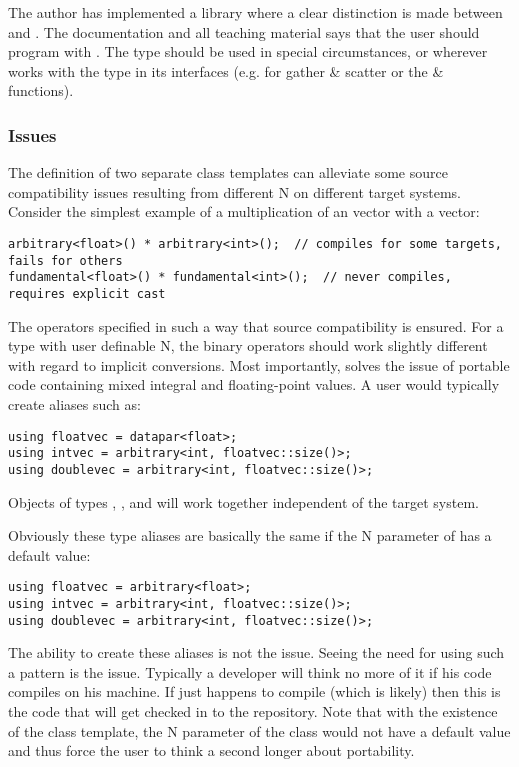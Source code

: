 The author has implemented a library where a clear distinction is made between  and .
The documentation and all teaching material says that the user should program with .
The  type should be used in special circumstances, or wherever  works with the  type in its interfaces (e.g. for gather \& scatter or the  \&  functions).

\subsubsection{Issues}
The definition of two separate class templates can alleviate some source compatibility issues resulting from different \code N on different target systems.
Consider the simplest example of a multiplication of an \intt vector with a \float vector:
\smallskip\begin{lstlisting}[style=Vc]
arbitrary<float>() * arbitrary<int>();  // compiles for some targets, fails for others
fundamental<float>() * fundamental<int>();  // never compiles, requires explicit cast
\end{lstlisting}
The \datapar[<T>] operators specified in such a way that source compatibility is ensured.
For a type with user definable \code N, the binary operators should work slightly different with regard to implicit conversions.
Most importantly,  solves the issue of portable code containing mixed integral and floating-point values.
A user would typically create aliases such as:
\smallskip\begin{lstlisting}[style=Vc]
using floatvec = datapar<float>;
using intvec = arbitrary<int, floatvec::size()>;
using doublevec = arbitrary<int, floatvec::size()>;
\end{lstlisting}
Objects of types , , and  will work together independent of the target system.

Obviously these type aliases are basically the same if the \code N parameter of  has a default value:
\smallskip\begin{lstlisting}[style=Vc]
using floatvec = arbitrary<float>;
using intvec = arbitrary<int, floatvec::size()>;
using doublevec = arbitrary<int, floatvec::size()>;
\end{lstlisting}
The ability to create these aliases is not the issue.
Seeing the need for using such a pattern is the issue.
Typically a developer will think no more of it if his code compiles on his machine.
If  just happens to compile (which is likely) then this is the code that will get checked in to the repository.
Note that with the existence of the  class template, the \code N parameter of the  class would not have a default value and thus force the user to think a second longer about portability.

